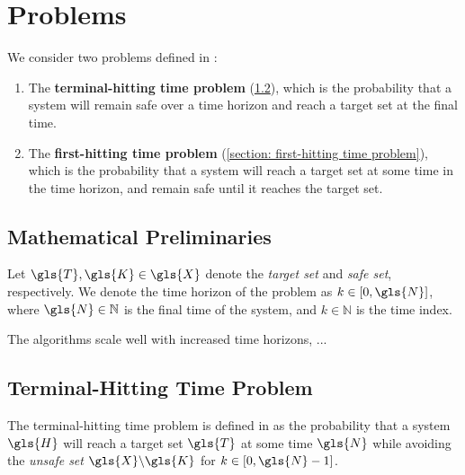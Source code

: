 \documentclass[11pt]{article}
\begin{document}

\section{Problems}
\label{section: problems}

We consider two problems defined in \cite{summers}:
\begin{enumerate}
  \item The \textbf{terminal-hitting time problem} (\ref{section: terminal-hitting time problem}), which is the probability that a system will remain safe over a time horizon and reach a target set at the final time.
  \item The \textbf{first-hitting time problem} (\ref{section: first-hitting time problem}), which is the probability that a system will reach a target set at some time in the time horizon, and remain safe until it reaches the target set.
\end{enumerate}


\subsection{Mathematical Preliminaries}

Let $\gls{T}, \gls{K} \in \gls{X}$ denote the \emph{target set} and \emph{safe set}, respectively.
%
We denote the time horizon of the problem as $k \in [0, \gls{N}]$, where $\gls{N} \in \mathbb{N}$ is the final time of the system, and $k \in \mathbb{N}$ is the time index.

The algorithms scale well with increased time horizons, ...


\subsection{Terminal-Hitting Time Problem}
\label{section: terminal-hitting time problem}

The terminal-hitting time problem is defined in \cite{summers} as the probability that a system $\gls{H}$ will reach a target set $\gls{T}$ at some time $\gls{N}$ while avoiding the \emph{unsafe set} $\gls{X}\backslash\gls{K}$ for $k \in [0, \gls{N}-1]$.
\end{document}
